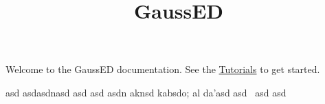\documentclass[
  letterpaper,
  DIV=11,
  numbers=noendperiod]{scrartcl}
\title{GaussED}
\author{}
\date{}
\begin{document}
\maketitle


Welcome to the GaussED documentation. See the
\href{examples/index.qmd}{Tutorials} to get started.

asd asdasdnasd asd asd asdn aknsd kabsdo; al da'\sld asd asd~ asd
\amsd asd
\end{document}
